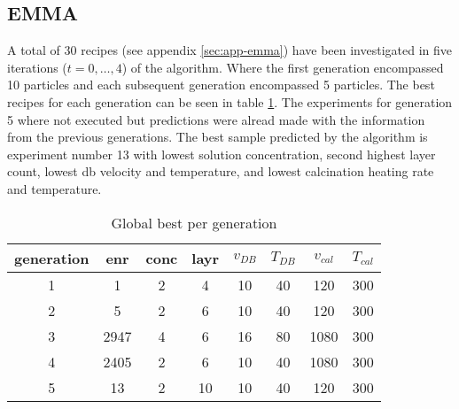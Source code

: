 \subsection{EMMA}
\label{sec:res-emma}

A total of 30 recipes (see appendix \ref{sec:app-emma}) have been investigated in 
five iterations ($t = 0, \dots, 4$) of the algorithm. 
Where the first generation encompassed 10 particles and each subsequent generation encompassed 5 particles. 
The best recipes for each generation can be seen in table \ref{tab:emma-Gb}. 
The experiments for generation 5 where not executed but 
predictions were alread made
with the information from the previous generations. 
The best sample predicted by the algorithm is experiment number 13 with 
lowest solution concentration, second highest layer count, lowest \gls{db} velocity and temperature, 
and lowest calcination heating rate and temperature. 

\begin{table}[htb]
	\centering
    \caption{Global best per generation}
	\label{tab:emma-Gb}
	\begin{tabular}{cccccccc}
        \hline\hline
        generation  &enr &conc &layr &$v_{DB}$ &$T_{DB}$ &$v_{cal}$ &$T_{cal}$\\
        \hline
     1   &1       &2    &4   &10   &40  &120  &300\\
     2   &5       &2    &6   &10   &40  &120  &300\\
     3   &2947    &4    &6   &16   &80 &1080  &300\\
     4   &2405    &2    &6   &10   &40 &1080  &300\\
     5   &13      &2   &10   &10   &40  &120  &300\\
    \hline\hline
	\end{tabular}
\end{table}

